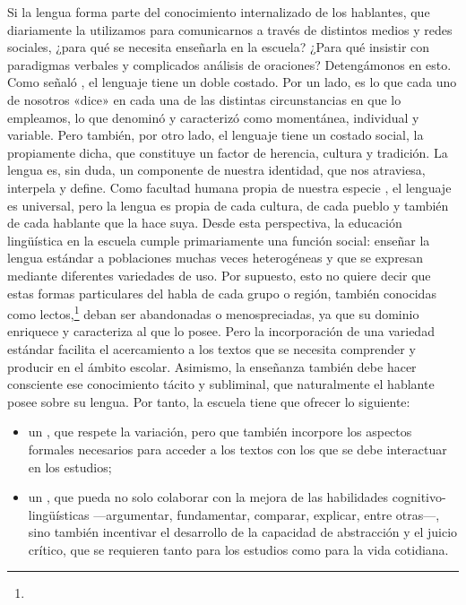 Si la lengua forma parte del conocimiento internalizado de los hablantes, que
diariamente la utilizamos para comunicarnos a través de distintos medios y
redes sociales, ¿para qué se necesita enseñarla en la escuela? ¿Para qué
insistir con paradigmas verbales y complicados análisis de oraciones?
Detengámonos en esto. Como señaló \textcite{saussure1945}, el lenguaje tiene
un doble costado. Por un lado, es lo que cada uno de nosotros «dice» en cada
una de las distintas circunstancias en que lo empleamos, lo que denominó
 y caracterizó como momentánea, individual y variable. Pero
también, por otro lado, el lenguaje tiene un costado social, la
 propiamente dicha, que constituye un factor de herencia,
cultura y tradición. La lengua es, sin duda, un componente de nuestra
identidad, que nos atraviesa, interpela y define. Como facultad humana propia
de nuestra especie \parencite{chomsky1989}, el lenguaje es universal, pero la
lengua es propia de cada cultura, de cada pueblo y también de cada hablante que
la hace suya. Desde esta perspectiva, la educación lingüística en la escuela
cumple primariamente una función social: enseñar la lengua estándar a
poblaciones muchas veces heterogéneas y que se expresan mediante diferentes
variedades de uso. Por supuesto, esto no quiere decir que estas formas
particulares del habla de cada grupo o región, también conocidas como
lectos,\footnote{}
deban ser abandonadas o menospreciadas, ya que su dominio enriquece y
caracteriza al que lo posee. Pero la incorporación de una variedad estándar
facilita el acercamiento a los textos que se necesita comprender y producir en
el ámbito escolar. Asimismo, la enseñanza también debe hacer consciente ese
conocimiento tácito y subliminal, que naturalmente el hablante posee sobre su
lengua. Por tanto, la escuela tiene que ofrecer lo siguiente:

\begin{itemize}
  \item un , que respete la variación, pero que
        también incorpore los aspectos formales necesarios para acceder a los
        textos con los que se debe interactuar en los estudios;
  \item un ,
        que pueda no solo colaborar con la mejora de las habilidades
        cognitivo-lingüísticas ---argumentar, fundamentar, comparar, explicar,
        entre otras---, sino también incentivar el desarrollo de la capacidad
        de abstracción y el juicio crítico, que se requieren tanto para los
        estudios como para la vida cotidiana.
\end{itemize}

